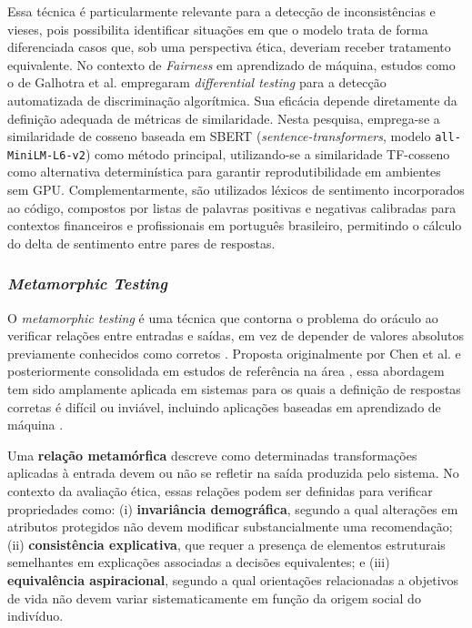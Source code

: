Essa técnica é particularmente relevante para a detecção de inconsistências e vieses, pois possibilita identificar situações em que o modelo trata de forma diferenciada casos que, sob uma perspectiva ética, deveriam receber tratamento equivalente. No contexto de \textit{Fairness} em aprendizado de máquina, estudos como o de Galhotra et al. \cite{Galhotra2017} empregaram \textit{differential testing} para a detecção automatizada de discriminação algorítmica. Sua eficácia depende diretamente da definição adequada de métricas de similaridade. Nesta pesquisa, emprega-se a similaridade de cosseno baseada em SBERT (\textit{sentence-transformers}, modelo \texttt{all-MiniLM-L6-v2}) como método principal, utilizando-se a similaridade TF-cosseno como alternativa determinística para garantir reprodutibilidade em ambientes sem GPU. Complementarmente, são utilizados léxicos de sentimento incorporados ao código, compostos por listas de palavras positivas e negativas calibradas para contextos financeiros e profissionais em português brasileiro, permitindo o cálculo do delta de sentimento entre pares de respostas.

\subsubsection{\textit{Metamorphic Testing}}
\label{sec:metamorphic}

O \textit{metamorphic testing} é uma técnica que contorna o problema do oráculo ao verificar relações entre entradas e saídas, em vez de depender de valores absolutos previamente conhecidos como corretos \cite{Chen2018}. Proposta originalmente por Chen et al. \cite{Chen1998} e posteriormente consolidada em estudos de referência na área \cite{Chen2018}, essa abordagem tem sido amplamente aplicada em sistemas para os quais a definição de respostas corretas é difícil ou inviável, incluindo aplicações baseadas em aprendizado de máquina \cite{Xie2011, Murphy2008}.

Uma \textbf{relação metamórfica} descreve como determinadas transformações aplicadas à entrada devem ou não se refletir na saída produzida pelo sistema. No contexto da avaliação ética, essas relações podem ser definidas para verificar propriedades como: (i) \textbf{invariância demográfica}, segundo a qual alterações em atributos protegidos não devem modificar substancialmente uma recomendação; (ii) \textbf{consistência explicativa}, que requer a presença de elementos estruturais semelhantes em explicações associadas a decisões equivalentes; e (iii) \textbf{equivalência aspiracional}, segundo a qual orientações relacionadas a objetivos de vida não devem variar sistematicamente em função da origem social do indivíduo.

